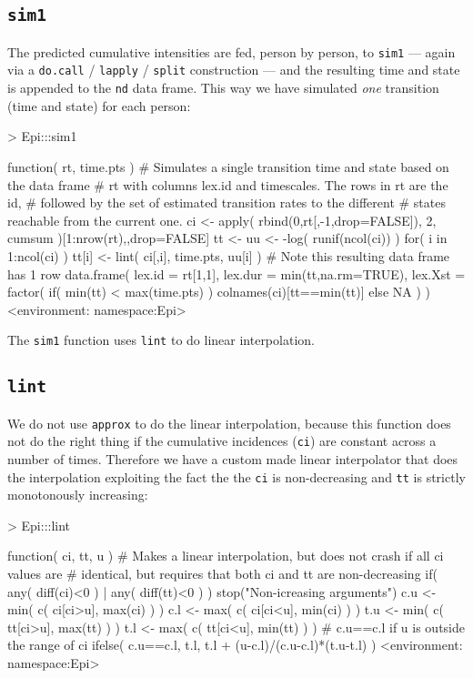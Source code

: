 \documentclass[a4paper,twoside,12pt]{report}
\begin{document}
\subsection{\texttt{sim1}}

The predicted cumulative intensities are fed, person by person, to
\texttt{sim1} --- again via a \texttt{do.call} / \texttt{lapply} /
\texttt{split} construction --- and the resulting time and state is
appended to the \texttt{nd} data frame. This way we have simulated
\emph{one} transition (time and state) for each person:
\begin{Schunk}
\begin{Sinput}
> Epi:::sim1
\end{Sinput}
\begin{Soutput}
function( rt, time.pts )
{
# Simulates a single transition time and state based on the data frame
# rt with columns lex.id and timescales. The rows in rt are the id,
# followed by the set of estimated transition rates to the different
# states reachable from the current one.
ci <- apply( rbind(0,rt[,-1,drop=FALSE]), 2, cumsum )[1:nrow(rt),,drop=FALSE]
tt <- uu <- -log( runif(ncol(ci)) )
for( i in 1:ncol(ci) ) tt[i] <- lint( ci[,i], time.pts, uu[i] )
# Note this resulting data frame has 1 row
data.frame( lex.id  = rt[1,1],
            lex.dur = min(tt,na.rm=TRUE),
            lex.Xst = factor( if( min(tt) < max(time.pts) )
                                  colnames(ci)[tt==min(tt)]
                              else NA ) )
}
<environment: namespace:Epi>
\end{Soutput}
\end{Schunk}
The \texttt{sim1} function uses \texttt{lint} to do linear interpolation.

\subsection{\texttt{lint}}

We do not use \texttt{approx} to do the linear interpolation, because
this function does not do the right thing if the cumulative incidences
(\texttt{ci}) are constant across a number of times. Therefore we have
a custom made linear interpolator that does the interpolation
exploiting the fact the the \texttt{ci} is non-decreasing and
\texttt{tt} is strictly monotonously increasing:
\begin{Schunk}
\begin{Sinput}
> Epi:::lint
\end{Sinput}
\begin{Soutput}
function( ci, tt, u )
{
# Makes a linear interpolation, but does not crash if all ci values are
# identical, but requires that both ci and tt are non-decreasing
if( any( diff(ci)<0 ) | any( diff(tt)<0 ) ) stop("Non-icreasing arguments")
c.u <- min( c( ci[ci>u], max(ci) ) )
c.l <- max( c( ci[ci<u], min(ci) ) )
t.u <- min( c( tt[ci>u], max(tt) ) )
t.l <- max( c( tt[ci<u], min(tt) ) )
# c.u==c.l if u is outside the range of ci
ifelse( c.u==c.l, t.l, t.l + (u-c.l)/(c.u-c.l)*(t.u-t.l) )
}
<environment: namespace:Epi>
\end{Soutput}
\end{Schunk}
\end{document}
